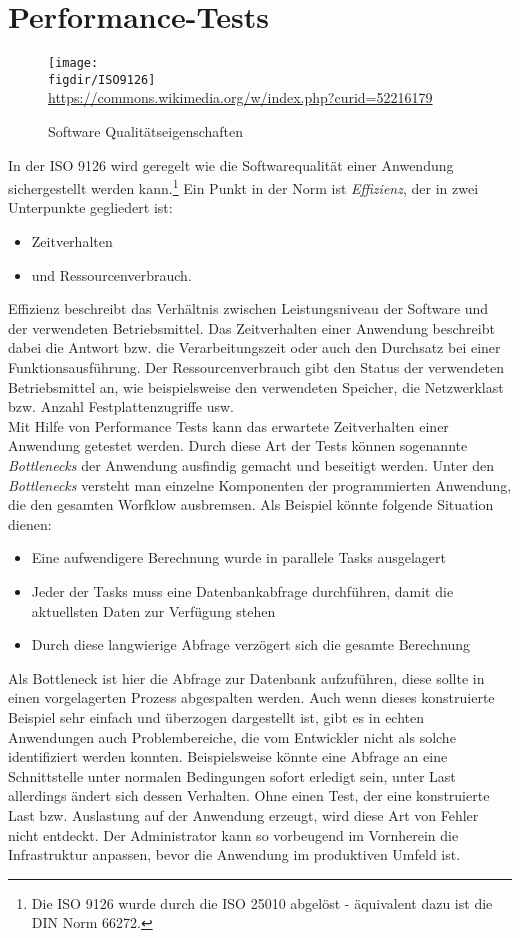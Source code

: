 \section{Performance-Tests}
\begin{figure}
	{\caption{Software Qualitätseigenschaften}
		\label{fig:ISO9126}}
	{\texttt{[image: \\figdir/ISO9126]}}\\
     \tiny{\quelle\url{https://commons.wikimedia.org/w/index.php?curid=52216179}\cite{ISO9126q74:online}}
\end{figure}
In der ISO 9126 wird geregelt wie die Softwarequalität einer Anwendung sichergestellt werden kann.\footnote{{} Die ISO 9126 wurde durch die ISO 25010 abgelöst - äquivalent dazu ist die DIN Norm 66272.}\cite{ISOIEC2533:online} Ein Punkt in der Norm ist \textit{Effizienz}, der in zwei Unterpunkte gegliedert ist:
\begin{itemize}
\item Zeitverhalten
\item und Ressourcenverbrauch.
\end{itemize}
Effizienz beschreibt das Verhältnis zwischen Leistungsniveau der Software und der verwendeten Betriebsmittel. Das Zeitverhalten einer Anwendung beschreibt dabei die Antwort bzw. die Verarbeitungszeit oder auch den Durchsatz bei einer Funktionsausführung. Der Ressourcenverbrauch gibt den Status der verwendeten Betriebsmittel an, wie beispielsweise den verwendeten Speicher, die Netzwerklast bzw. Anzahl Festplattenzugriffe usw.\\
Mit Hilfe von Performance Tests kann das erwartete Zeitverhalten einer Anwendung getestet werden. Durch diese Art der Tests können sogenannte \textit{Bottlenecks} der Anwendung ausfindig gemacht und beseitigt werden. Unter den \textit{Bottlenecks} versteht man einzelne Komponenten der programmierten Anwendung, die den gesamten Worfklow ausbremsen. Als Beispiel könnte folgende Situation dienen:
\begin{itemize}
    \item Eine aufwendigere Berechnung wurde in parallele Tasks ausgelagert
    \item Jeder der Tasks muss eine Datenbankabfrage durchführen, damit die aktuellsten Daten zur Verfügung stehen
    \item Durch diese langwierige Abfrage verzögert sich die gesamte Berechnung
\end{itemize}
Als Bottleneck ist hier die Abfrage zur Datenbank aufzuführen, diese sollte in einen vorgelagerten Prozess abgespalten werden. Auch wenn dieses konstruierte Beispiel sehr einfach und überzogen dargestellt ist, gibt es in echten Anwendungen auch Problembereiche, die vom Entwickler nicht als solche identifiziert werden konnten. Beispielsweise könnte eine Abfrage an eine Schnittstelle unter normalen Bedingungen sofort erledigt sein, unter Last allerdings ändert sich dessen Verhalten. Ohne einen Test, der eine konstruierte Last bzw. Auslastung auf der Anwendung erzeugt, wird diese Art von Fehler nicht entdeckt. Der Administrator kann so vorbeugend im Vornherein die Infrastruktur anpassen, bevor die Anwendung im produktiven Umfeld ist.\newline
 
